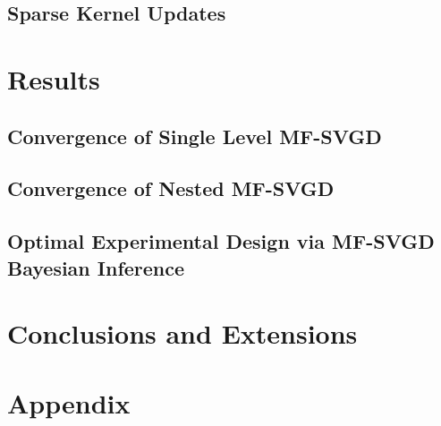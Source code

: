 \documentclass[12pt]{article}
\newcommand\Mycomb[2][^n]{\prescript{#1\mkern-0.5mu}{}C_{#2}}
\renewcommand{\[}{\left[}
\renewcommand{\]}{\right]}
\renewcommand{\(}{\left(}
\renewcommand{\)}{\right)}
\begin{document}

\subsection{Sparse Kernel Updates}

\section{Results}

\subsection{Convergence of Single Level MF-SVGD}

\subsection{Convergence of Nested MF-SVGD}

\subsection{Optimal Experimental Design via MF-SVGD Bayesian Inference}



\subsection{}

\section{Conclusions and Extensions}






\section*{Appendix}
\end{document}
